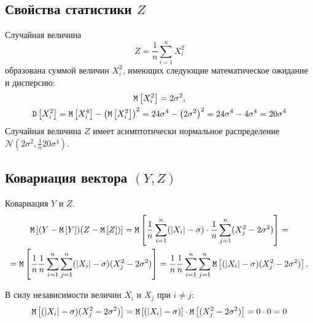 \subsection*{Свойства статистики $Z$}

Случайная величина
\begin{equation}
    Z = \frac{1}{n} \sum_{i=1}^n X_i^2
\end{equation}
образована суммой величин $X_i^2$, имеющих следующие математическое ожидание и дисперсию:
\begin{gather}
    \mathtt{M} \left [ X_i^2 \right ] = 2 \sigma^2, \\
    \mathtt{D} \left [ X_i^2 \right ]
    = \mathtt{M} \left [ X_i^4 \right ] - \left ( \mathtt{M} \left [ X_i^2 \right ] \right )^2
    = 24 \sigma^4 - \left ( 2 \sigma^2 \right )^2
    = 24 \sigma^4 - 4 \sigma^4 = 20 \sigma^4
\end{gather}
Случайная величина $Z$ имеет асимптотически нормальное распределение $\mathcal{N} \left ( 2 \sigma^2, \frac{1}{n} 20 \sigma^4 \right )$.

\subsection*{Ковариация вектора $(Y, Z)$}

Ковариация $Y$ и $Z$.
\begin{multline}
    \mathtt{M} \left [ ( Y - \mathtt{M} \left [ Y \right ] ) ( Z - \mathtt{M} \left [ Z \right ])  \right ]
    = \mathtt{M} \left [  \frac{1}{n} \sum_{i=1}^{n} ( \left | X_i \right | - \sigma ) \cdot \frac{1}{n} \sum_{j=1}^n ( X_j^2 - 2 \sigma^2 )  \right ] = \\
    = \mathtt{M} \left [  \frac{1}{n} \frac{1}{n} \sum_{i=1}^{n} \sum_{j=1}^n ( \left | X_i \right | - \sigma ) ( X_j^2 - 2 \sigma^2 )  \right ]
    = \frac{1}{n} \frac{1}{n} \sum_{i=1}^{n} \sum_{j=1}^n \mathtt{M} \left [  ( \left | X_i \right | - \sigma ) ( X_j^2 - 2 \sigma^2 )  \right ] .
\end{multline}

В силу независимости величин $X_i$ и $X_j$ при $i \neq j$:
\begin{equation}
    \mathtt{M} \left [  ( \left | X_i \right | - \sigma ) ( X_j^2 - 2 \sigma^2 )  \right ]
    = \mathtt{M} \left [  ( \left | X_i \right | - \sigma )  \right ] \cdot \mathtt{M} \left [  ( X_j^2 - 2 \sigma^2 )  \right ]
    = 0 \cdot 0
    = 0
\end{equation}

